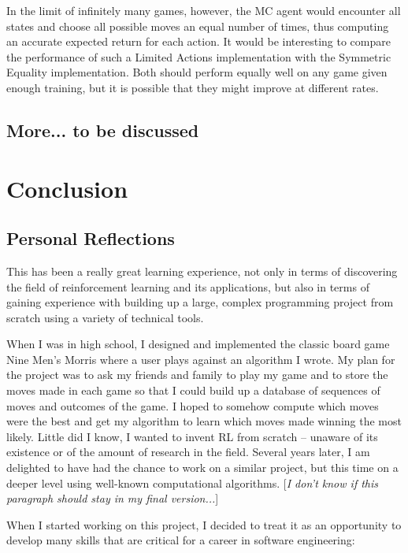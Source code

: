 \documentclass[11pt,a4paper]{report}
\begin{document}
In the limit of infinitely many games, however, the MC agent would encounter all states and choose all possible moves an equal number of times, thus computing an accurate expected return for each action. It would be interesting to compare the performance of such a Limited Actions implementation with the Symmetric Equality implementation. Both should perform equally well on any game given enough training, but it is possible that they might improve at different rates.


\section{More... to be discussed}


\chapter{Conclusion}




\section{Personal Reflections}

This has been a really great learning experience, not only in terms of discovering the field of reinforcement learning and its applications, but also in terms of gaining experience with building up a large, complex programming project from scratch using a variety of technical tools.

When I was in high school, I designed and implemented the classic board game Nine Men’s Morris where a user plays against an algorithm I wrote. My plan for the project was to ask my friends and family to play my game and to store the moves made in each game so that I could build up a database of sequences of moves and outcomes of the game. I hoped to somehow compute which moves were the best and get my algorithm to learn which moves made winning the most likely. Little did I know, I wanted to invent RL from scratch – unaware of its existence or of the amount of research in the field. Several years later, I am delighted to have had the chance to work on a similar project, but this time on a deeper level using well-known computational algorithms. [\emph{I don't know if this paragraph should stay in my final version...}]

When I started working on this project, I decided to treat it as an opportunity to develop many skills that are critical for a career in software engineering:
\end{document}
